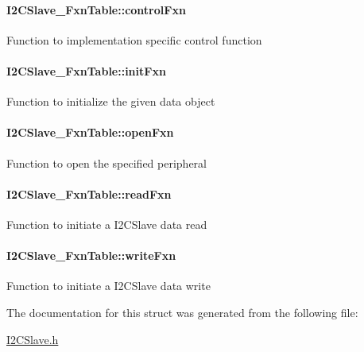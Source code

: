 \paragraph[{control\+Fxn}]{ I2\+C\+Slave\+\_\+\+Fxn\+Table\+::control\+Fxn}\label{struct_i2_c_slave___fxn_table_a5d9e1649f54e3ac467254e1812ae37f4}
Function to implementation specific control function 
\paragraph[{init\+Fxn}]{ I2\+C\+Slave\+\_\+\+Fxn\+Table\+::init\+Fxn}\label{struct_i2_c_slave___fxn_table_aa33c7271b7f99e9b1c1391f9181b010d}
Function to initialize the given data object 
\paragraph[{open\+Fxn}]{ I2\+C\+Slave\+\_\+\+Fxn\+Table\+::open\+Fxn}\label{struct_i2_c_slave___fxn_table_ae9eabd5257e4c7c69454ca932f0aeaa8}
Function to open the specified peripheral 
\paragraph[{read\+Fxn}]{ I2\+C\+Slave\+\_\+\+Fxn\+Table\+::read\+Fxn}\label{struct_i2_c_slave___fxn_table_a010cac9104f7fd8204737253873d7438}
Function to initiate a I2\+C\+Slave data read 
\paragraph[{write\+Fxn}]{ I2\+C\+Slave\+\_\+\+Fxn\+Table\+::write\+Fxn}\label{struct_i2_c_slave___fxn_table_a3ffab7eeff49da96baac7a496f06a269}
Function to initiate a I2\+C\+Slave data write 

The documentation for this struct was generated from the following file\+:\begin{DoxyCompactItemize}
\item 
\hyperlink{_i2_c_slave_8h}{I2\+C\+Slave.\+h}\end{DoxyCompactItemize}
